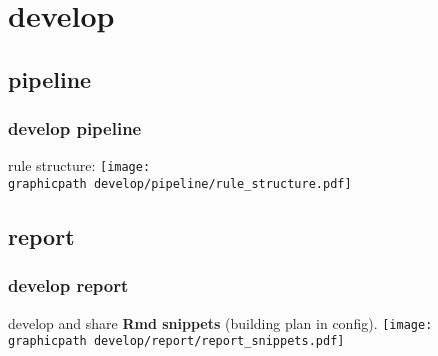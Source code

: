 \documentclass[t]{beamer}
\newcommand{\graphicpath}{../}
\begin{document}
\section{develop}

\subsection{pipeline}

\begin{frame}
\frametitle{develop pipeline}
rule structure:
\vfill
\centering
\texttt{[image: \\graphicpath develop/pipeline/rule\_structure.pdf]}%
\end{frame}

\subsection{report}

\begin{frame}
\frametitle{develop report}
develop and share \textbf{Rmd snippets} (building plan in config).
\vfill
\centering
\texttt{[image: \\graphicpath develop/report/report\_snippets.pdf]}%
\end{frame}
\end{document}
